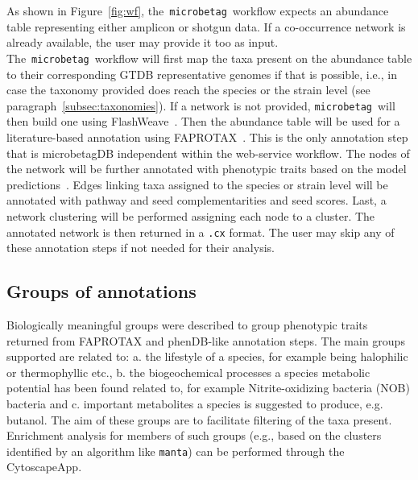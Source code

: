 \documentclass[sn-mathphys,Numbered]{sn-jnl}  %
\theoremstyle{thmstyleone}%
\theoremstyle{thmstyletwo}%
\theoremstyle{thmstylethree}%
\newcommand{\microbetag}{\texttt{microbetag}}
\begin{document}
        As shown in Figure~\ref{fig:wf}, the~\microbetag~workflow expects an abundance table representing either amplicon or shotgun data.
        If a co-occurrence network is already available, the user may provide it too as input.
        The~\microbetag~workflow will first map the taxa present on the abundance table to their corresponding GTDB representative genomes if that is possible, i.e., in case the taxonomy provided does reach the species or the strain level (see paragraph~\ref{subsec:taxonomies}).
        If a network is not provided, \microbetag~will then build one using FlashWeave~\cite{flashweave_cite}.
        Then the abundance table will be used for a literature-based annotation using FAPROTAX~\cite{louca2016decoupling}.
        This is the only annotation step that is microbetagDB independent within the web-service workflow.
        The nodes of the network will be further annotated with phenotypic traits based on the model predictions~\cite{feldbauer2015prediction}.
        Edges linking taxa assigned to the species or strain level will be annotated with pathway and seed complementarities and seed scores.
        Last, a network clustering will be performed assigning each node to a cluster.
        The annotated network is then returned in a \texttt{.cx} format. 
        The user may skip any of these annotation steps if not needed for their analysis.




    \subsection*{Groups of annotations}
    \label{subsec:groups}

        Biologically meaningful groups were described to group phenotypic traits returned from FAPROTAX and phenDB-like annotation steps.
        The main groups supported are related to: 
        a. the lifestyle of a species, for example being halophilic or thermophyllic etc.,
        b. the biogeochemical processes a species metabolic potential has been found related to, for example Nitrite-oxidizing bacteria (NOB) bacteria and 
        c. important metabolites a species is suggested to produce, e.g. butanol.
        The aim of these groups are to facilitate filtering of the taxa present.
        Enrichment analysis for members of such groups 
        (e.g., based on the clusters identified by an algorithm like \texttt{manta}) 
        can be performed through the CytoscapeApp.
\end{document}
